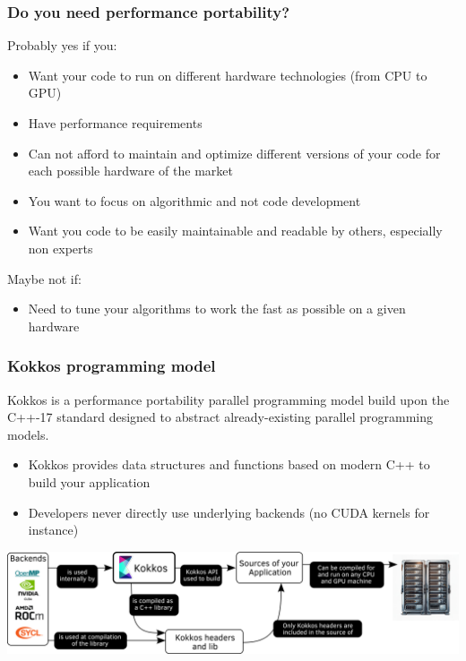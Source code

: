 \documentclass[aspectratio=169]{beamer}
\begin{document}
\begin{frame}
\frametitle{Do you need performance portability?}
Probably yes if you:
\begin{itemize}
    \item Want your code to run on different hardware technologies (from CPU to GPU)
    \item Have performance requirements
    \item Can not afford to maintain and optimize different versions of your code for each possible hardware of the market
    \item You want to focus on algorithmic and not code development
    \item Want you code to be easily maintainable and readable by others, especially non experts
\end{itemize}

Maybe not if:
\begin{itemize}
    \item Need to tune your algorithms to work the fast as possible on a given hardware
\end{itemize}

\end{frame}


\begin{frame}
    \frametitle{Kokkos programming model}

    Kokkos is a performance portability parallel programming model build upon the C++-17 standard designed to abstract already-existing parallel programming models.

    \hspace{0.5cm}

    \begin{itemize}
        \item Kokkos provides data structures and functions based on modern C++ to build your application
        \item Developers never directly use underlying backends (no CUDA kernels for instance)
    \end{itemize}

    \begin{center}
        \includegraphics[width=1\textwidth]{../../images/kokkos_model.png}
    \end{center}

\end{frame}
\end{document}
